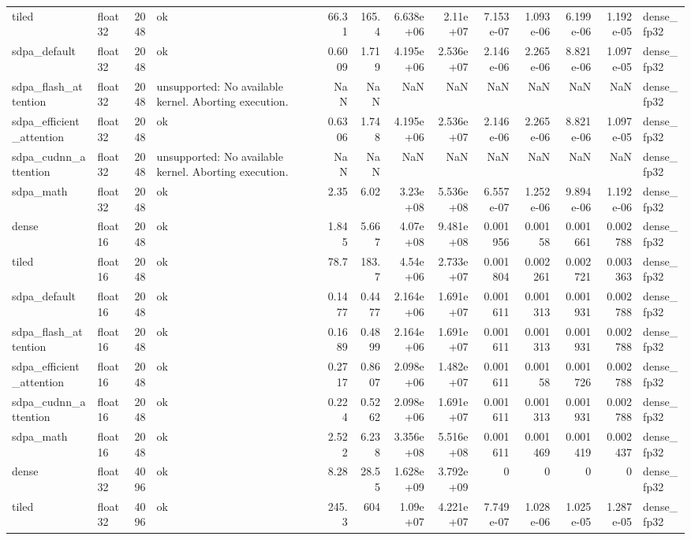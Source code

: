\begin{table}
\begin{tabular}{llrlrrrrrrrrl}
tiled & float32 & 2048 & ok & 66.31 & 165.4 & 6.638e+06 & 2.11e+07 & 7.153e-07 & 1.093e-06 & 6.199e-06 & 1.192e-05 & dense\_fp32 \\
sdpa\_default & float32 & 2048 & ok & 0.6009 & 1.719 & 4.195e+06 & 2.536e+07 & 2.146e-06 & 2.265e-06 & 8.821e-06 & 1.097e-05 & dense\_fp32 \\
sdpa\_flash\_attention & float32 & 2048 & unsupported: No available kernel. Aborting execution. & NaN & NaN & NaN & NaN & NaN & NaN & NaN & NaN & dense\_fp32 \\
sdpa\_efficient\_attention & float32 & 2048 & ok & 0.6306 & 1.748 & 4.195e+06 & 2.536e+07 & 2.146e-06 & 2.265e-06 & 8.821e-06 & 1.097e-05 & dense\_fp32 \\
sdpa\_cudnn\_attention & float32 & 2048 & unsupported: No available kernel. Aborting execution. & NaN & NaN & NaN & NaN & NaN & NaN & NaN & NaN & dense\_fp32 \\
sdpa\_math & float32 & 2048 & ok & 2.35 & 6.02 & 3.23e+08 & 5.536e+08 & 6.557e-07 & 1.252e-06 & 9.894e-06 & 1.192e-06 & dense\_fp32 \\
dense & float16 & 2048 & ok & 1.845 & 5.667 & 4.07e+08 & 9.481e+08 & 0.001956 & 0.00158 & 0.001661 & 0.002788 & dense\_fp32 \\
tiled & float16 & 2048 & ok & 78.7 & 183.7 & 4.54e+06 & 2.733e+07 & 0.001804 & 0.002261 & 0.002721 & 0.003363 & dense\_fp32 \\
sdpa\_default & float16 & 2048 & ok & 0.1477 & 0.4477 & 2.164e+06 & 1.691e+07 & 0.001611 & 0.001313 & 0.001931 & 0.002788 & dense\_fp32 \\
sdpa\_flash\_attention & float16 & 2048 & ok & 0.1689 & 0.4899 & 2.164e+06 & 1.691e+07 & 0.001611 & 0.001313 & 0.001931 & 0.002788 & dense\_fp32 \\
sdpa\_efficient\_attention & float16 & 2048 & ok & 0.2717 & 0.8607 & 2.098e+06 & 1.482e+07 & 0.001611 & 0.00158 & 0.001726 & 0.002788 & dense\_fp32 \\
sdpa\_cudnn\_attention & float16 & 2048 & ok & 0.224 & 0.5262 & 2.098e+06 & 1.691e+07 & 0.001611 & 0.001313 & 0.001931 & 0.002788 & dense\_fp32 \\
sdpa\_math & float16 & 2048 & ok & 2.522 & 6.238 & 3.356e+08 & 5.516e+08 & 0.001611 & 0.001469 & 0.001419 & 0.002437 & dense\_fp32 \\
dense & float32 & 4096 & ok & 8.28 & 28.55 & 1.628e+09 & 3.792e+09 & 0 & 0 & 0 & 0 & dense\_fp32 \\
tiled & float32 & 4096 & ok & 245.3 & 604 & 1.09e+07 & 4.221e+07 & 7.749e-07 & 1.028e-06 & 1.025e-05 & 1.287e-05 & dense\_fp32 \\

\end{tabular}
\end{table}
